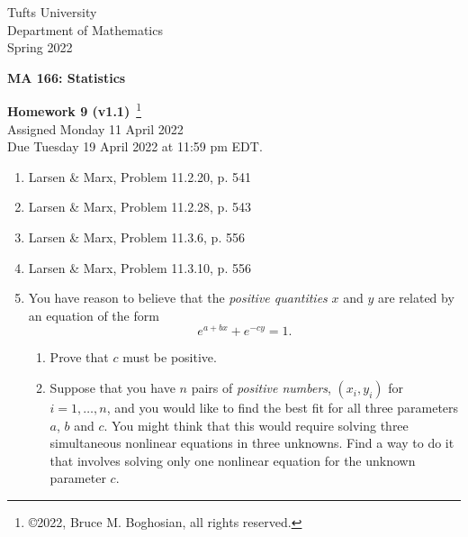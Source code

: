 \documentclass [12pt] {article}
\begin{document}
\thispagestyle{empty}
\begin{center}
Tufts University\\
Department of Mathematics\\
Spring 2022 \\
\end{center}
\begin{center}
{\bf MA 166: Statistics}\\
\end{center}
\begin{center}
{\bf\Large Homework 9 {\small (v1.1)}}~\footnote{\copyright 2022, Bruce M. Boghosian, all rights reserved.}\\
Assigned Monday 11 April 2022\\
Due Tuesday 19 April 2022 at 11:59 pm EDT.
\end{center}

\begin{enumerate}

\item Larsen \& Marx, Problem 11.2.20, p. 541

\item Larsen \& Marx, Problem 11.2.28, p. 543

\item Larsen \& Marx, Problem 11.3.6, p. 556

\item Larsen \& Marx, Problem 11.3.10, p. 556

\item You have reason to believe that the \textit{positive quantities} $x$ and $y$ are related by an equation of the form
\[
e^{a+bx} + e^{-cy} = 1.
\]
	\begin{enumerate}
	\item Prove that $c$ must be positive.
	\item Suppose that you have $n$ pairs of \textit{positive numbers}, $(x_i,y_i)$ for $i=1,\ldots,n$, and you would like to find the best fit for all three parameters $a$, $b$ and $c$.  You might think that this would require solving three simultaneous nonlinear equations in three unknowns.  Find a way to do it that involves solving only one nonlinear equation for the unknown parameter $c$.
	\end{enumerate}

\end{enumerate}
\end{document}
